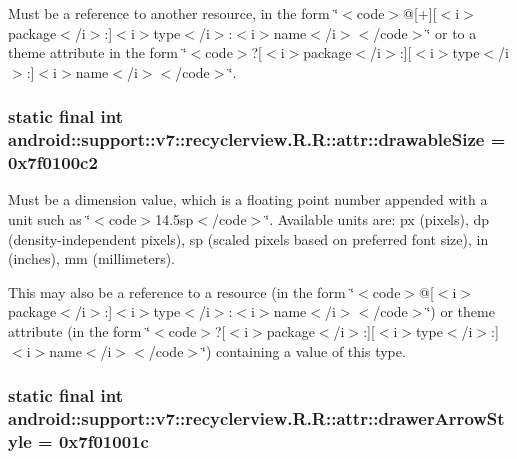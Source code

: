 Must be a reference to another resource, in the form \char`\"{}$<$code$>$@\mbox{[}+\mbox{]}\mbox{[}$<$i$>$package$<$/i$>$:\mbox{]}$<$i$>$type$<$/i$>$:$<$i$>$name$<$/i$>$$<$/code$>$\char`\"{} or to a theme attribute in the form \char`\"{}$<$code$>$?\mbox{[}$<$i$>$package$<$/i$>$:\mbox{]}\mbox{[}$<$i$>$type$<$/i$>$:\mbox{]}$<$i$>$name$<$/i$>$$<$/code$>$\char`\"{}. \hypertarget{classandroid_1_1support_1_1v7_1_1recyclerview_1_1_r_1_1attr_f03de5cd04dcc02ee4e0bde324425bdc}{
\subsubsection[{drawableSize}]{\setlength{\rightskip}{0pt plus 5cm}static final int android::support::v7::recyclerview.R.R::attr::drawableSize = 0x7f0100c2}}
\label{classandroid_1_1support_1_1v7_1_1recyclerview_1_1_r_1_1attr_f03de5cd04dcc02ee4e0bde324425bdc}


Must be a dimension value, which is a floating point number appended with a unit such as \char`\"{}$<$code$>$14.5sp$<$/code$>$\char`\"{}. Available units are: px (pixels), dp (density-independent pixels), sp (scaled pixels based on preferred font size), in (inches), mm (millimeters). 

This may also be a reference to a resource (in the form \char`\"{}$<$code$>$@\mbox{[}$<$i$>$package$<$/i$>$:\mbox{]}$<$i$>$type$<$/i$>$:$<$i$>$name$<$/i$>$$<$/code$>$\char`\"{}) or theme attribute (in the form \char`\"{}$<$code$>$?\mbox{[}$<$i$>$package$<$/i$>$:\mbox{]}\mbox{[}$<$i$>$type$<$/i$>$:\mbox{]}$<$i$>$name$<$/i$>$$<$/code$>$\char`\"{}) containing a value of this type. \hypertarget{classandroid_1_1support_1_1v7_1_1recyclerview_1_1_r_1_1attr_51a4f298987324bc36fb8381aebc1f95}{
\subsubsection[{drawerArrowStyle}]{\setlength{\rightskip}{0pt plus 5cm}static final int android::support::v7::recyclerview.R.R::attr::drawerArrowStyle = 0x7f01001c}}
\label{classandroid_1_1support_1_1v7_1_1recyclerview_1_1_r_1_1attr_51a4f298987324bc36fb8381aebc1f95}


